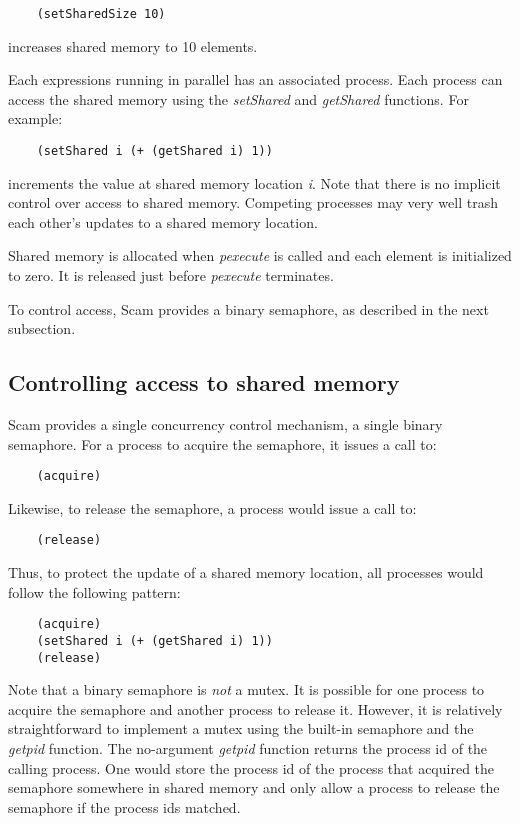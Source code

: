 \begin{verbatim}
    (setSharedSize 10)
\end{verbatim}

increases shared memory to 10 elements.

Each expressions running in parallel has an associated process. Each process
can access the shared memory using the {\it setShared} and {\it getShared}
functions.  For example:

\begin{verbatim}
    (setShared i (+ (getShared i) 1))
\end{verbatim}

increments the value at shared memory location {\it i}. Note that there
is no implicit control over access to shared memory. Competing processes
may very well trash each other's updates to a shared memory location.

Shared memory is allocated when {\it pexecute} is called and each element
is initialized to zero. It is released
just before {\it pexecute} terminates. 

To control access, Scam provides a binary semaphore, as described
in the next subsection.

\subsection{Controlling access to shared memory}

Scam provides a single concurrency control mechanism, a single binary
semaphore. For a process to acquire the semaphore, it issues a call to:

\begin{verbatim}
    (acquire)
\end{verbatim}

Likewise, to release the semaphore, a process would issue a call to:

\begin{verbatim}
    (release)
\end{verbatim}

Thus, to protect the update of a shared memory location, all processes
would follow the following pattern:

\begin{verbatim}
    (acquire)
    (setShared i (+ (getShared i) 1))
    (release)
\end{verbatim}

Note that a binary semaphore is {\it not} a mutex. It is possible for
one process to acquire the semaphore and another process to release it.
However, it is relatively straightforward to implement a mutex using
the built-in semaphore and the {\it getpid} function. The no-argument
{\it getpid} function returns the process id of the calling process.
One would store the process id of the process that acquired
the semaphore somewhere in shared memory and only allow
a process to release the semaphore if the process ids matched.

